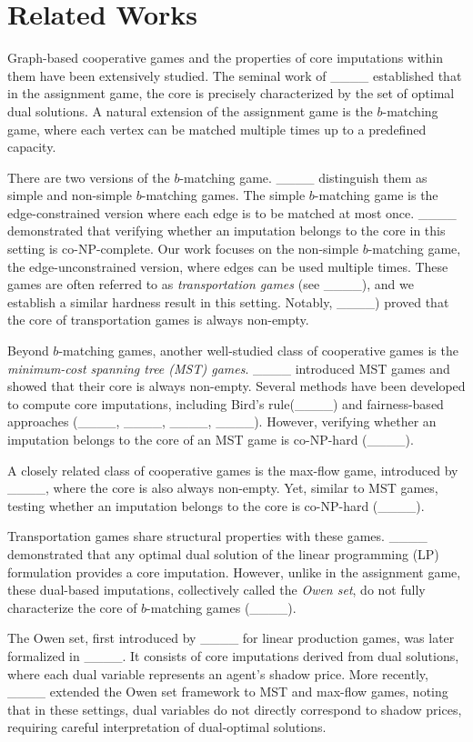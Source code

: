 \section{Related Works}
Graph-based cooperative games and the properties of core imputations within them have been extensively studied. The seminal work of ____ established that in the assignment game, the core is precisely characterized by the set of optimal dual solutions. A natural extension of the assignment game is the $b$-matching game, where each vertex can be matched multiple times up to a predefined capacity.

There are two versions of the $b$-matching game. ____ distinguish them as simple and non-simple $b$-matching games. The simple $b$-matching game is the edge-constrained version where each edge is to be matched at most once. ____ demonstrated that verifying whether an imputation belongs to the core in this setting is co-NP-complete. Our work focuses on the non-simple $b$-matching game, the edge-unconstrained version, where edges can be used multiple times. These games are often referred to as \textit{transportation games} (see ____), and we establish a similar hardness result in this setting. Notably, ____) proved that the core of transportation games is always non-empty.

Beyond $b$-matching games, another well-studied class of cooperative games is the \textit{minimum-cost spanning tree (MST) games}. ____ introduced MST games and showed that their core is always non-empty. Several methods have been developed to compute core imputations, including Bird’s rule(____) and fairness-based approaches (____, ____, ____, ____). However, verifying whether an imputation belongs to the core of an MST game is co-NP-hard (____).

A closely related class of cooperative games is the max-flow game, introduced by ____, where the core is also always non-empty. Yet, similar to MST games, testing whether an imputation belongs to the core is co-NP-hard (____).

Transportation games share structural properties with these games. ____ demonstrated that any optimal dual solution of the linear programming (LP) formulation provides a core imputation. However, unlike in the assignment game, these dual-based imputations, collectively called the \textit{Owen set}, do not fully characterize the core of $b$-matching games (____).

The Owen set, first introduced by ____ for linear production games, was later formalized in ____. It consists of core imputations derived from dual solutions, where each dual variable represents an agent's shadow price. More recently, ____ extended the Owen set framework to MST and max-flow games, noting that in these settings, dual variables do not directly correspond to shadow prices, requiring careful interpretation of dual-optimal solutions.

